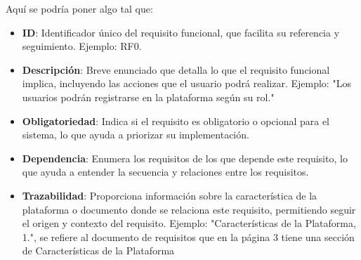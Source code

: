 \documentclass{article}
\begin{document}
	Aquí se podría poner algo tal que:
	\begin{itemize}
		\item \textbf{ID}: Identificador único del requisito funcional, que facilita su referencia y seguimiento. Ejemplo: RF0.
		
		\item \textbf{Descripción}: Breve enunciado que detalla lo que el requisito funcional implica, incluyendo las acciones que el usuario podrá realizar. Ejemplo: "Los usuarios podrán registrarse en la plataforma según su rol."
		
		\item \textbf{Obligatoriedad}: Indica si el requisito es obligatorio o opcional para el sistema, lo que ayuda a priorizar su implementación. 
		
		\item \textbf{Dependencia}: Enumera los requisitos de los que depende este requisito, lo que ayuda a entender la secuencia y relaciones entre los requisitos.
		
		\item \textbf{Trazabilidad}: Proporciona información sobre la característica de la plataforma o documento donde se relaciona este requisito, permitiendo seguir el origen y contexto del requisito. Ejemplo: "Características de la Plataforma, 1.", se refiere al documento de requisitos que en la página 3 tiene una sección de Características de la Plataforma 
	\end{itemize}
	
\end{document}
